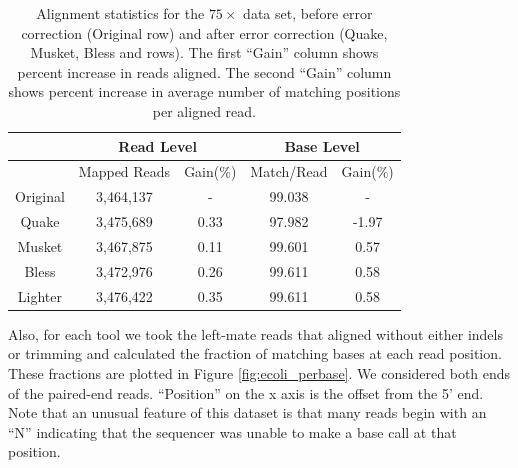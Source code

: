 \documentclass[10pt]{article}
\begin{document}
\begin{table}
\centering
\begin{tabular}{|c|c|c||c|c|} \hline
	 & \multicolumn{2}{|c||}{Read Level} & \multicolumn{2}{|c|}{Base Level} \\ \hline
     & Mapped Reads & Gain(\%) & Match/Read & Gain(\%) \\ \hline
Original & 	3,464,137	 & - & 99.038	& - \\ \hline
Quake	& 3,475,689	& 0.33	& 97.982	& -1.97  \\ \hline
Musket	& 3,467,875	& 0.11	& 99.601	& 0.57  \\ \hline
Bless	& 3,472,976	& 0.26	& 99.611	& 0.58  \\ \hline
Lighter	&  3,476,422	& 0.35	& 99.611	& 0.58  \\ \hline
\end{tabular}
\caption{Alignment statistics for the $75\times$ \ecoli data set, before error correction (Original row) and after error correction (Quake, Musket, Bless and \tool rows).  The first ``Gain'' column shows percent increase in reads aligned.  The second ``Gain'' column shows percent increase in average number of matching positions per aligned read.\label{table:ecoli_alignment}}
\end{table}



Also, for each tool we took the left-mate reads that aligned without either indels or trimming and calculated the fraction of matching bases at each read position.  These fractions are plotted in Figure \ref{fig:ecoli_perbase}.  We considered both ends of the paired-end reads.   ``Position'' on the x axis is the offset from the 5' end.  Note that an unusual feature of this dataset is that many reads begin with an ``N'' indicating that the sequencer was unable to make a base call at that position.
\end{document}
